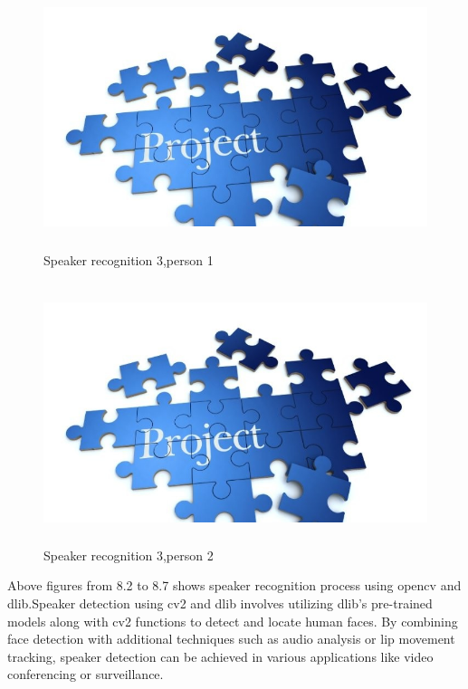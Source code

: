 \documentclass[12pt,a4paper]{report}
\begin{document}
\begin{figure} [hbtp]
\centering
\includegraphics[width=5in,height=3in]{./pic/sample.jpg}
\caption{Speaker recognition 3,person 1}
\end{figure}

\begin{figure} [hbtp]
\centering
\includegraphics[width=5in,height=3in]{./pic/sample.jpg}
\caption{Speaker recognition 3,person 2}
\end{figure}
\newpage
\par Above figures from 8.2 to 8.7 shows speaker recognition process using opencv and dlib.Speaker detection using cv2 and dlib involves utilizing dlib's pre-trained models along with cv2 functions to detect and locate human faces. By combining face detection with additional techniques such as audio analysis or lip movement tracking, speaker detection can be achieved in various applications like video conferencing or surveillance.
\end{document}
